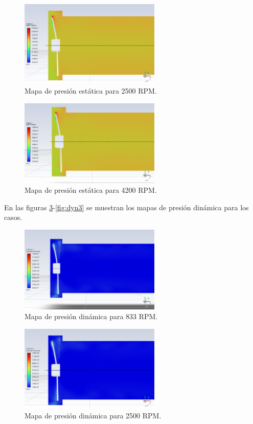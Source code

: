 \begin{figure}[!ht]
    \centering
    \includegraphics[width=0.6\textwidth]{images/sta2.png}
    \caption{Mapa de presión estática para 2500 RPM.}
    \label{fig:sta2}
\end{figure}

\begin{figure}[!ht]
    \centering
    \includegraphics[width=0.6\textwidth]{images/sta3.png}
    \caption{Mapa de presión estática para 4200 RPM.}
    \label{fig:sta3}
\end{figure}

\pagebreak
En las figuras \ref{fig:dyn1}-\ref{fig:dyn3} se muestran los mapas de presión dinámica para los casos.

\begin{figure}[!ht]
    \centering
    \includegraphics[width=0.6\textwidth]{images/dyn1.png}
    \caption{Mapa de presión dinámica para 833 RPM.}
    \label{fig:dyn1}
\end{figure}

\begin{figure}[!ht]
    \centering
    \includegraphics[width=0.6\textwidth]{images/dyn2.png}
    \caption{Mapa de presión dinámica para 2500 RPM.}
    \label{fig:dyn2}
\end{figure}

